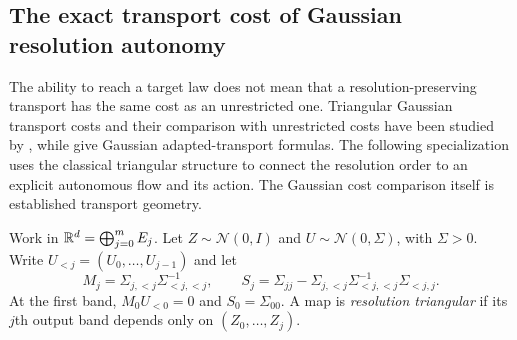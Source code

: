 \subsection{The exact transport cost of Gaussian resolution autonomy}
The ability to reach a target law does not mean that a resolution-preserving transport has the same cost as an unrestricted one. Triangular Gaussian transport costs and their comparison with unrestricted costs have been studied by \citet{bukin2018}, while \citet{acciaio2025} give Gaussian adapted-transport formulas. The following specialization uses the classical triangular structure \citep{rosenblatt1952,hosseini2025} to connect the resolution order to an explicit autonomous flow and its action. The Gaussian cost comparison itself is established transport geometry.

Work in $\mathbb R^d=\bigoplus_{j=0}^mE_j$. Let $Z\sim\mathcal N(0,I)$ and $U\sim\mathcal N(0,\Sigma)$, with $\Sigma>0$. Write $U_{<j}=(U_0,\ldots,U_{j-1})$ and let
\begin{equation}\label{eq:schur-bands}
 M_j=\Sigma_{j,<j}\Sigma_{<j,<j}^{-1},\qquad
 S_j=\Sigma_{jj}-\Sigma_{j,<j}\Sigma_{<j,<j}^{-1}\Sigma_{<j,j}.
\end{equation}
At the first band, $M_0U_{<0}=0$ and $S_0=\Sigma_{00}$. A map is \emph{resolution triangular} if its $j$th output band depends only on $(Z_0,\ldots,Z_j)$.

